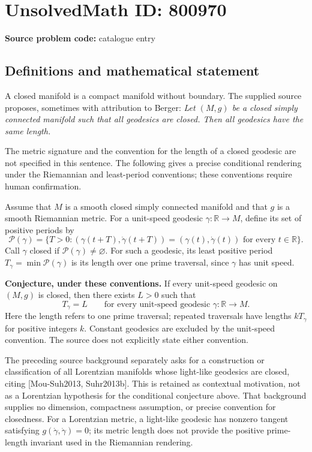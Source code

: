 \documentclass[11pt]{article}
\newcommand{\R}{\mathbb{R}}
\begin{document}
\section*{UnsolvedMath ID: 800970}
\textbf{Source problem code:} catalogue entry
\subsection{Definitions and mathematical statement}
A closed manifold is a compact manifold without boundary. The supplied source proposes, sometimes with attribution to Berger: \emph{Let \((M,g)\) be a closed simply connected manifold such that all geodesics are closed. Then all geodesics have the same length.}

The metric signature and the convention for the length of a closed geodesic are not specified in this sentence. The following gives a precise conditional rendering under the Riemannian and least-period conventions; these conventions require human confirmation.

Assume that \(M\) is a smooth closed simply connected manifold and that \(g\) is a smooth Riemannian metric. For a unit-speed geodesic \(\gamma\colon\R\to M\), define its set of positive periods by
\[
\mathcal P(\gamma)=\{T>0:(\gamma(t+T),\dot\gamma(t+T))=(\gamma(t),\dot\gamma(t))\text{ for every }t\in\R\}.
\]
Call \(\gamma\) closed if \(\mathcal P(\gamma)\ne\varnothing\). For such a geodesic, its least positive period \(T_\gamma=\min\mathcal P(\gamma)\) is its length over one prime traversal, since \(\gamma\) has unit speed.

\textbf{Conjecture, under these conventions.} If every unit-speed geodesic on \((M,g)\) is closed, then there exists \(L>0\) such that
\[
T_\gamma=L\qquad\text{for every unit-speed geodesic }\gamma\colon\R\to M.
\]
Here the length refers to one prime traversal; repeated traversals have lengths \(kT_\gamma\) for positive integers \(k\). Constant geodesics are excluded by the unit-speed convention. The source does not explicitly state either convention.

The preceding source background separately asks for a construction or classification of all Lorentzian manifolds whose light-like geodesics are closed, citing \textnormal{[Mou-Suh2013, Suhr2013b]}. This is retained as contextual motivation, not as a Lorentzian hypothesis for the conditional conjecture above. That background supplies no dimension, compactness assumption, or precise convention for closedness. For a Lorentzian metric, a light-like geodesic has nonzero tangent satisfying \(g(\dot\gamma,\dot\gamma)=0\); its metric length does not provide the positive prime-length invariant used in the Riemannian rendering.
\end{document}
